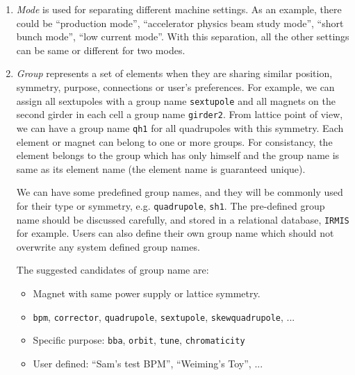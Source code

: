 \documentclass[11pt,oneside,letterpaper,showtrims,article]{memoir}
\newcommand{\code}[1]{\texttt{#1}}
\begin{document}
\begin{enumerate}
\item \emph{Mode}
is used for separating different machine settings. As an example, there
could be ``production mode'', ``accelerator physics beam study mode'',
``short bunch mode'', ``low current mode''. With this separation, all
the other settings can be same or different for two modes.

\item \emph{Group} represents a set of elements when they are
  sharing similar position, symmetry, purpose, connections or user's
  preferences. For example, we can assign all sextupoles with a group name
  \code{sextupole} and all magnets on the second girder in each cell a
  group name \code{girder2}. From lattice point of view, we can have a
  group name \code{qh1} for all quadrupoles with this symmetry. Each
  element or magnet can belong to one or more groups.  For consistancy,
  the element belongs to the group which has only himself and the group
  name is same as its element name (the element name is guaranteed
  unique).

  We can have some predefined group names, and they will be commonly used
  for their type or symmetry, e.g. \code{quadrupole}, \code{sh1}. The
  pre-defined group name should be discussed carefully, and stored in a
  relational database, \code{IRMIS} for example. Users can also define
  their own group name which should not overwrite any system defined group
  names.

  The suggested candidates of group name are:
  \begin{itemize}
  \item Magnet with same power supply or lattice symmetry.
  \item \code{bpm}, \code{corrector}, \code{quadrupole}, \code{sextupole},
    \code{skewquadrupole}, ...
  \item Specific purpose: \code{bba}, \code{orbit}, \code{tune},
    \code{chromaticity}
  \item User defined: ``Sam's test BPM'', ``Weiming's Toy'', ...
  \end{itemize}


\end{enumerate}
\end{document}
